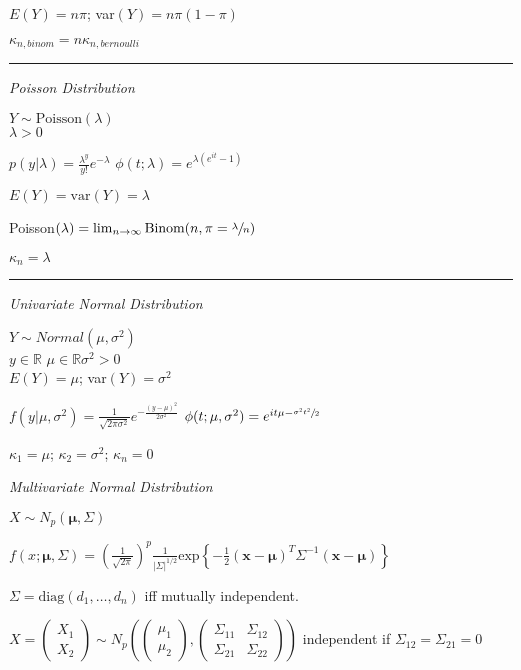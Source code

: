 \documentclass[notitlepage,10pt,twocolumn]{article}
\renewcommand\exp[1]{\text{exp}\left\{ #1 \right\}}
\begin{document}
$E(Y) = n \pi$; var$(Y) = n\pi(1-\pi)$

$\kappa_{n,\textit{binom}} = n \kappa_{n,\textit{bernoulli}}$

\vspace{.15cm}\hrule \vspace{.15cm}

\emph{\sffamily Poisson Distribution}

$Y \sim \text{Poisson}(\lambda)$\\
	$\lambda > 0$

$p(y|\lambda) = \frac{\lambda^y}{y!}e^{-\lambda}$ \quad $\phi(t;\lambda) = e^{\lambda(e^{it}-1)}$

$E(Y) = \text{var}(Y) = \lambda$

Poisson$(\lambda) = \lim_{n\to\infty}\text{Binom}(n,\pi= \sfrac{\lambda}{n})$

$\kappa_n = \lambda$

\vspace{.15cm}\hrule \vspace{.15cm}

\emph{\sffamily Univariate Normal Distribution}

$Y \sim Normal(\mu,\sigma^2)$\\
	$y \in \mathbb{R}$ \quad $\mu \in \mathbb{R}$\quad $\sigma^2 >0$\\
	$E(Y) = \mu$; var$(Y) = \sigma^2$

$f(y|\mu,\sigma^2) = \frac{1}{\sqrt{2\pi \sigma^2}}e^{-\frac{(y-\mu)^2}{2\sigma^2}}$ \quad $\phi(t;\mu,\sigma^2) = e^{it\mu - \sfrac{\sigma^2 t^2}{2}}$

$\kappa_1 = \mu$; $\kappa_2 = \sigma^2$; $\kappa_n = 0$

\vspace{.15cm}

\emph{\sffamily Multivariate Normal Distribution}

$X \sim N_p(\boldsymbol\mu,\Sigma)$

$f(x;\boldsymbol\mu,\Sigma) = \left(\frac{1}{\sqrt{2\pi}}\right)^p\frac{1}{|\Sigma|^{1/2}}\exp{-\frac{1}{2}(\boldsymbol x - \boldsymbol\mu)^T \Sigma^{-1}(\boldsymbol x - \boldsymbol\mu) }$

$\Sigma = \text{diag}(d_1,\dots,d_n)$ iff mutually independent.

$X = \begin{pmatrix}
X_1\\
X_2
\end{pmatrix} \sim N_p\left( \begin{pmatrix}
\mu_1 \\
\mu_2
\end{pmatrix}, \begin{pmatrix}
\Sigma_{11} & \Sigma_{12} \\
\Sigma_{21} & \Sigma_{22}
\end{pmatrix}\right)$ independent if $\Sigma_{12} = \Sigma_{21}= 0$
\end{document}
